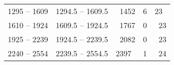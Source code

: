 \documentclass[]{book}
\begin{document}
\begin{longtable}[]{@{}lllll@{}}
\begin{minipage}[t]{0.18\columnwidth}
1295 -- 1609\strut
\end{minipage} & \begin{minipage}[t]{0.23\columnwidth}\raggedright
1294.5 -- 1609.5\strut
\end{minipage} & \begin{minipage}[t]{0.13\columnwidth}\raggedright
~1452\strut
\end{minipage} & \begin{minipage}[t]{0.14\columnwidth}\raggedright
6\strut
\end{minipage} & \begin{minipage}[t]{0.17\columnwidth}\raggedright
23\strut
\end{minipage}\tabularnewline
\begin{minipage}[t]{0.18\columnwidth}\raggedright
1610 -- 1924\strut
\end{minipage} & \begin{minipage}[t]{0.23\columnwidth}\raggedright
1609.5 -- 1924.5\strut
\end{minipage} & \begin{minipage}[t]{0.13\columnwidth}\raggedright
~1767\strut
\end{minipage} & \begin{minipage}[t]{0.14\columnwidth}\raggedright
0\strut
\end{minipage} & \begin{minipage}[t]{0.17\columnwidth}\raggedright
~23\strut
\end{minipage}\tabularnewline
\begin{minipage}[t]{0.18\columnwidth}\raggedright
1925 -- 2239\strut
\end{minipage} & \begin{minipage}[t]{0.23\columnwidth}\raggedright
1924.5 -- 2239.5\strut
\end{minipage} & \begin{minipage}[t]{0.13\columnwidth}\raggedright
~2082\strut
\end{minipage} & \begin{minipage}[t]{0.14\columnwidth}\raggedright
0\strut
\end{minipage} & \begin{minipage}[t]{0.17\columnwidth}\raggedright
~23\strut
\end{minipage}\tabularnewline
\begin{minipage}[t]{0.18\columnwidth}\raggedright
2240 -- 2554\strut
\end{minipage} & \begin{minipage}[t]{0.23\columnwidth}\raggedright
2239.5 -- 2554.5\strut
\end{minipage} & \begin{minipage}[t]{0.13\columnwidth}\raggedright
2397\strut
\end{minipage} & \begin{minipage}[t]{0.14\columnwidth}\raggedright
1\strut
\end{minipage} & \begin{minipage}[t]{0.17\columnwidth}\raggedright
~24\strut
\end{minipage}\tabularnewline
\bottomrule
\end{longtable}
\end{document}
